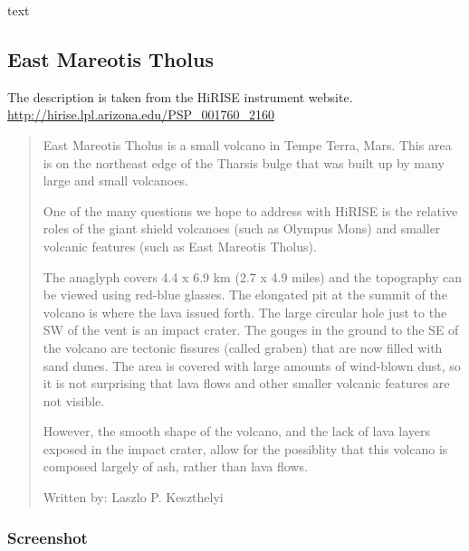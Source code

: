 text

\subsection{East Mareotis Tholus}

The description is taken from the HiRISE instrument website.
\url{http://hirise.lpl.arizona.edu/PSP_001760_2160}

\begin{quotation}
East Mareotis Tholus is a small volcano in Tempe Terra, Mars. This
area is on the northeast edge of the Tharsis bulge that was built up
by many large and small volcanoes.

One of the many questions we hope to address with HiRISE is the
relative roles of the giant shield volcanoes (such as Olympus Mons)
and smaller volcanic features (such as East Mareotis Tholus).

The anaglyph covers 4.4 x 6.9 km (2.7 x 4.9 miles) and the topography
can be viewed using red-blue glasses. The elongated pit at the summit
of the volcano is where the lava issued forth. The large circular hole
just to the SW of the vent is an impact crater. The gouges in the
ground to the SE of the volcano are tectonic fissures (called graben)
that are now filled with sand dunes. The area is covered with large
amounts of wind-blown dust, so it is not surprising that lava flows
and other smaller volcanic features are not visible.

However, the smooth shape of the volcano, and the lack of lava layers
exposed in the impact crater, allow for the possiblity that this
volcano is composed largely of ash, rather than lava flows.

Written by: Laszlo P. Keszthelyi
\end{quotation}

\subsubsection*{Screenshot}

